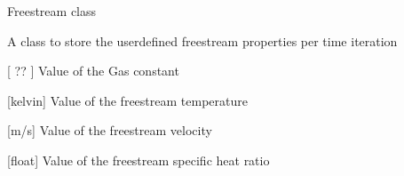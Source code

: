 \documentclass[letterpaper,10pt,english]{sphinxmanual}
\begin{document}
\begin{fulllineitems}
\label{\detokenize{modules:configuration.Freestream}}
\pysigstartsignatures
{}
\pysigstopsignatures
\sphinxAtStartPar
Freestream class

\sphinxAtStartPar
A class to store the user\sphinxhyphen{}defined freestream properties per time iteration

\begin{fulllineitems}
\label{\detokenize{modules:configuration.Freestream.R}}
\pysigstartsignatures
{}
\pysigstopsignatures
\sphinxAtStartPar
{[} ?? {]} Value of the Gas constant

\end{fulllineitems}


\begin{fulllineitems}
\label{\detokenize{modules:configuration.Freestream.Temperature}}
\pysigstartsignatures
{}
\pysigstopsignatures
\sphinxAtStartPar
{[}kelvin{]} Value of the freestream temperature

\end{fulllineitems}


\begin{fulllineitems}
\label{\detokenize{modules:configuration.Freestream.Velocity}}
\pysigstartsignatures
{}
\pysigstopsignatures
\sphinxAtStartPar
{[}m/s{]} Value of the freestream velocity

\end{fulllineitems}


\begin{fulllineitems}
\label{\detokenize{modules:configuration.Freestream.gamma}}
\pysigstartsignatures
{}
\pysigstopsignatures
\sphinxAtStartPar
{[}float{]} Value of the freestream specific heat ratio


\end{fulllineitems}
\end{fulllineitems}
\end{document}
